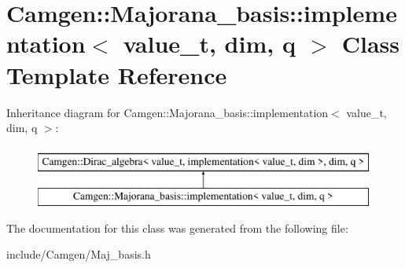 \hypertarget{a00291}{\section{Camgen\-:\-:Majorana\-\_\-basis\-:\-:implementation$<$ value\-\_\-t, dim, q $>$ Class Template Reference}
\label{a00291}
}
Inheritance diagram for Camgen\-:\-:Majorana\-\_\-basis\-:\-:implementation$<$ value\-\_\-t, dim, q $>$\-:\begin{figure}[H]
\begin{center}
\leavevmode
\includegraphics[height=2.000000cm]{a00291}
\end{center}
\end{figure}


The documentation for this class was generated from the following file\-:\begin{DoxyCompactItemize}
\item 
include/\-Camgen/Maj\-\_\-basis.\-h\end{DoxyCompactItemize}
